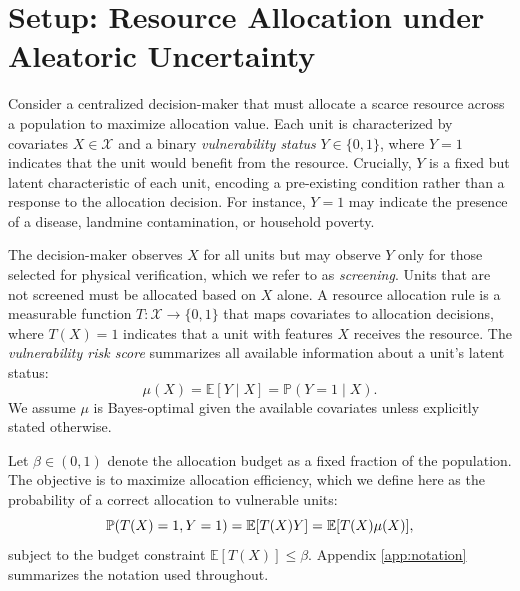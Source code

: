 
\section{Setup: Resource Allocation under Aleatoric Uncertainty}

Consider a centralized decision-maker that must allocate a scarce resource across a population to maximize allocation value. Each unit is characterized by covariates $X \in \mathcal{X}$ and a binary \textit{vulnerability status} $Y \in \{0,1\}$, where $Y=1$ indicates that the unit would benefit from the resource. Crucially, $Y$ is a fixed but latent characteristic of each unit, encoding a pre-existing condition rather than a response to the allocation decision. For instance, $Y=1$ may indicate the presence of a disease,  landmine contamination, or household poverty. 

The decision-maker observes $X$ for all units but may observe $Y$ only for those selected for physical verification, which we refer to as \textit{screening}. Units that are not screened must be allocated based on $X$ alone. A resource allocation rule is a measurable function $T: \mathcal{X} \to \{0,1\}$ that maps covariates to allocation decisions, where $T(X)=1$ indicates that a unit with features $X$ receives the resource. The \textit{vulnerability risk score} summarizes all available information about a unit's latent status:
\begin{equation}
  \mu(X) = \mathbb{E}[Y \mid X] = \mathbb{P}(Y=1 \mid X).
\end{equation}
We assume $\mu$ is Bayes-optimal given the available covariates unless explicitly stated otherwise.


Let $\beta \in (0,1)$ denote the allocation budget as a fixed fraction of the population. The objective is to maximize allocation efficiency, which we define here as the probability of a correct allocation to vulnerable units:
\begin{equation}
  \mathbb{P}(T(X) = 1, Y = 1) = \mathbb{E}[T(X)Y] = \mathbb{E}[T(X)\mu(X)],
\end{equation}
subject to the budget constraint $\mathbb{E}[T(X)] \leq \beta$. Appendix \ref{app:notation} summarizes the notation used throughout.

